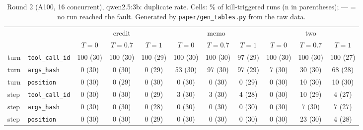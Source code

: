 \begin{table}[t]
\centering
\small
\begin{tabular}{llccccccccc}
\toprule
 & & \multicolumn{3}{c}{credit} & \multicolumn{3}{c}{memo} & \multicolumn{3}{c}{two} \\
 & & $T{=}0$ & $T{=}0.7$ & $T{=}1$ & $T{=}0$ & $T{=}0.7$ & $T{=}1$ & $T{=}0$ & $T{=}0.7$ & $T{=}1$ \\
\midrule
turn & \texttt{tool\_call\_id} & 100 {\scriptsize(30)} & 100 {\scriptsize(30)} & 100 {\scriptsize(29)} & 100 {\scriptsize(30)} & 100 {\scriptsize(30)} & 97 {\scriptsize(29)} & 100 {\scriptsize(30)} & 100 {\scriptsize(30)} & 100 {\scriptsize(27)} \\
turn & \texttt{args\_hash} & 0 {\scriptsize(30)} & 0 {\scriptsize(30)} & 0 {\scriptsize(29)} & 53 {\scriptsize(30)} & 97 {\scriptsize(30)} & 97 {\scriptsize(29)} & 7 {\scriptsize(30)} & 30 {\scriptsize(30)} & 68 {\scriptsize(28)} \\
turn & \texttt{position} & 0 {\scriptsize(30)} & 0 {\scriptsize(29)} & 0 {\scriptsize(30)} & 0 {\scriptsize(30)} & 0 {\scriptsize(30)} & 0 {\scriptsize(29)} & 0 {\scriptsize(30)} & 10 {\scriptsize(30)} & 10 {\scriptsize(30)} \\
\midrule
step & \texttt{tool\_call\_id} & 0 {\scriptsize(30)} & 0 {\scriptsize(30)} & 0 {\scriptsize(29)} & 3 {\scriptsize(30)} & 3 {\scriptsize(30)} & 4 {\scriptsize(28)} & 0 {\scriptsize(30)} & 10 {\scriptsize(29)} & 4 {\scriptsize(27)} \\
step & \texttt{args\_hash} & 0 {\scriptsize(30)} & 0 {\scriptsize(30)} & 0 {\scriptsize(28)} & 0 {\scriptsize(30)} & 0 {\scriptsize(30)} & 0 {\scriptsize(30)} & 0 {\scriptsize(30)} & 7 {\scriptsize(30)} & 7 {\scriptsize(27)} \\
step & \texttt{position} & 0 {\scriptsize(30)} & 0 {\scriptsize(30)} & 0 {\scriptsize(29)} & 0 {\scriptsize(30)} & 0 {\scriptsize(30)} & 0 {\scriptsize(30)} & 0 {\scriptsize(30)} & 23 {\scriptsize(30)} & 4 {\scriptsize(28)} \\
\bottomrule
\end{tabular}
\caption{Round 2 (A100, 16 concurrent), qwen2.5:3b: duplicate rate. Cells: \% of kill-triggered runs (n in parentheses); --- = no run reached the fault. Generated by \texttt{paper/gen\_tables.py} from the raw data.}
\label{tab:r2dup}
\end{table}

